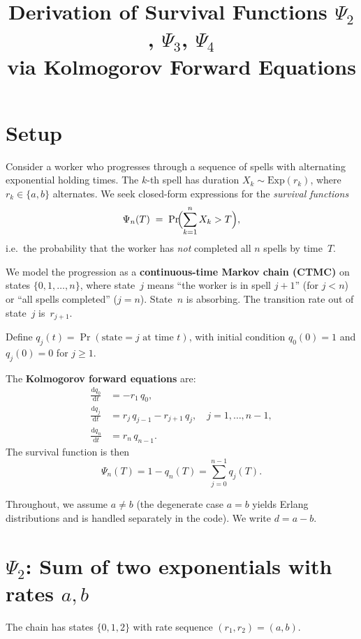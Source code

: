 \documentclass[11pt,a4paper]{article}
\title{Derivation of Survival Functions $\Psi_2$, $\Psi_3$, $\Psi_4$\\[4pt]
\large via Kolmogorov Forward Equations}
\author{}
\date{}
\newcommand{\dd}{\mathrm{d}}
\begin{document}
\maketitle

\section{Setup}

Consider a worker who progresses through a sequence of spells with
alternating exponential holding times.  The $k$-th spell has duration
$X_k \sim \text{Exp}(r_k)$, where $r_k \in \{a, b\}$ alternates.
We seek closed-form expressions for the \emph{survival functions}
\[
  \Psi_n(T) \;=\; \Pr\!\Bigl(\sum_{k=1}^{n} X_k > T\Bigr),
\]
i.e.\ the probability that the worker has \emph{not} completed all $n$
spells by time~$T$.

We model the progression as a \textbf{continuous-time Markov chain (CTMC)}
on states $\{0, 1, \ldots, n\}$, where state~$j$ means ``the worker is in
spell $j{+}1$'' (for $j < n$) or ``all spells completed'' ($j = n$).
State~$n$ is absorbing.  The transition rate out of state~$j$ is~$r_{j+1}$.

Define $q_j(t) = \Pr(\text{state} = j \text{ at time } t)$, with initial
condition $q_0(0) = 1$ and $q_j(0) = 0$ for $j \geq 1$.

The \textbf{Kolmogorov forward equations} are:
\begin{align}
  \frac{\dd q_0}{\dd t} &= -r_1 \, q_0, \label{eq:fwd0}\\[4pt]
  \frac{\dd q_j}{\dd t} &= r_j \, q_{j-1} - r_{j+1} \, q_j,
    \quad j = 1, \ldots, n-1, \label{eq:fwdj}\\[4pt]
  \frac{\dd q_n}{\dd t} &= r_n \, q_{n-1}. \label{eq:fwdn}
\end{align}
The survival function is then
\[
  \Psi_n(T) = 1 - q_n(T) = \sum_{j=0}^{n-1} q_j(T).
\]

Throughout, we assume $a \neq b$ (the degenerate case $a = b$ yields
Erlang distributions and is handled separately in the code).
We write $d = a - b$.

\section{$\Psi_2$: Sum of two exponentials with rates $a, b$}

The chain has states $\{0, 1, 2\}$ with rate sequence $(r_1, r_2) = (a, b)$.
\end{document}
